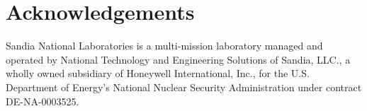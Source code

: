 \chapter*{Acknowledgements}

Sandia National Laboratories is a multi-mission laboratory managed and operated by National Technology and 
Engineering Solutions of Sandia, LLC., a wholly owned subsidiary of Honeywell International, Inc., for the U.S. 
Department of Energy’s National Nuclear Security Administration under contract DE-NA-0003525. 

